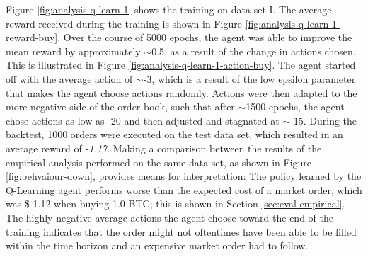 Figure \ref{fig:analysis-q-learn-1} shows the training on data set I.
The average reward received during the training is shown in Figure \ref{fig:analysis-q-learn-1-reward-buy}.
Over the course of 5000 epochs, the agent was able to improve the mean reward by approximately $\sim$0.5, as a result of the change in actions chosen.  This is illustrated in Figure \ref{fig:analysis-q-learn-1-action-buy}.
The agent started off with the average action of $\sim$-3, which is a result of the low epsilon parameter that makes the agent choose actions randomly.
Actions were then adapted to the more negative side of the order book, such that after $\sim$1500 epochs, the agent chose actions as low as -20 and then adjusted and stagnated at $\sim$-15.
During the backtest, 1000 orders were executed on the test data set, which resulted in an average reward of \textit{-1.17}.
Making a comparison between the results of the empirical analysis performed on the same data set, as shown in Figure \ref{fig:behvaiour-down}, provides means for interpretation:
The policy learned by the Q-Learning agent performs worse than the expected cost of a market order, which was \$-1.12 when buying 1.0 BTC; this is shown in Section \ref{sec:eval-empirical}.
The highly negative average actions the agent choose toward the end of the training indicates that the order might not oftentimes have been able to be filled within the time horizon and an expensive market order had to follow.


